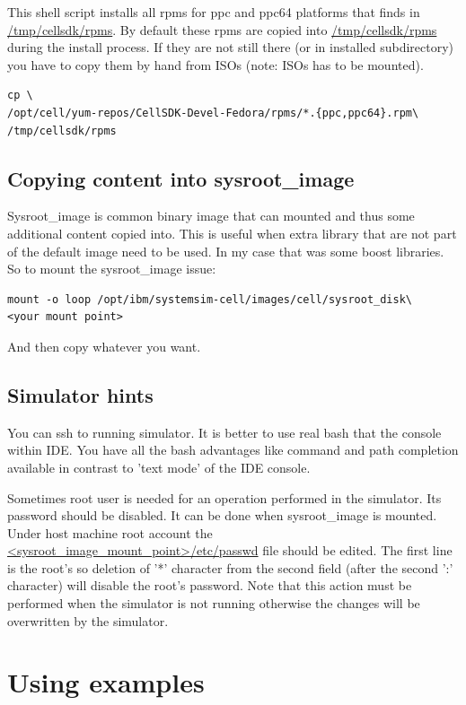 This shell script installs all rpms for ppc and ppc64 platforms that finds in \url{/tmp/cellsdk/rpms}.
By default these rpms are copied into \url{/tmp/cellsdk/rpms} during the install process.
If they are not still there (or in installed subdirectory) you have to copy them by hand from ISOs (note: ISOs has to be mounted).

\begin{verbatim}
cp \
/opt/cell/yum-repos/CellSDK-Devel-Fedora/rpms/*.{ppc,ppc64}.rpm\
/tmp/cellsdk/rpms
\end{verbatim}

\subsection{Copying content into sysroot\_image}

Sysroot\_image is common binary image that can mounted and thus some additional content copied into.
This is useful when extra library that are not part of the default image need to be used.
In my case that was some boost libraries. So to mount the sysroot\_image issue:
\begin{verbatim}
mount -o loop /opt/ibm/systemsim-cell/images/cell/sysroot_disk\
<your mount point>
\end{verbatim}
And then copy whatever you want.

\subsection{Simulator hints}

\par
You can ssh to running simulator. It is better to use real bash that the console within IDE.
You have all the bash advantages like command and path completion available in contrast to 'text mode' of the IDE console.

\par
Sometimes root user is needed for an operation performed in the simulator.
Its password should be disabled.
It can be done when sysroot\_image is mounted.
Under host machine root account the \url{<sysroot_image_mount_point>/etc/passwd} file should be edited.
The first line is the root's so deletion of '*' character from the second field (after the second ':' character) will disable the root's password.
Note that this action must be performed when the simulator is not running otherwise the changes will be overwritten by the simulator.

\section{Using examples}

